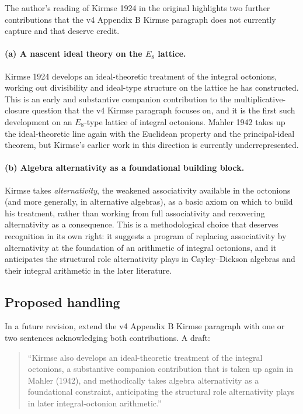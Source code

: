 \documentclass[11pt]{amsart}
\theoremstyle{remark}
\begin{document}
The author's reading of Kirmse 1924 in the original highlights two
further contributions that the v4 Appendix B Kirmse paragraph does
not currently capture and that deserve credit.

\paragraph{(a) A nascent ideal theory on the $E_8$ lattice.}
Kirmse 1924 develops an ideal-theoretic treatment of the integral
octonions, working out divisibility and ideal-type structure on the
lattice he has constructed.  This is an early and substantive
companion contribution to the multiplicative-closure question that
the v4 Kirmse paragraph focuses on, and it is the first such
development on an $E_8$-type lattice of integral octonions.  Mahler
1942 takes up the ideal-theoretic line again with the Euclidean
property and the principal-ideal theorem, but Kirmse's earlier
work in this direction is currently underrepresented.

\paragraph{(b) Algebra alternativity as a foundational building block.}
Kirmse takes \emph{alternativity}, the weakened associativity
available in the octonions (and more generally, in alternative
algebras), as a basic axiom on which to build his treatment,
rather than working from full associativity and recovering
alternativity as a consequence.  This is a methodological choice
that deserves recognition in its own right: it suggests a
program of replacing associativity by alternativity at the
foundation of an arithmetic of integral octonions, and it
anticipates the structural role alternativity plays in
Cayley--Dickson algebras and their integral arithmetic in the later
literature.

\subsection*{Proposed handling}

In a future revision, extend the v4 Appendix B Kirmse paragraph
with one or two sentences acknowledging both contributions.  A
draft:

\begin{quote}
``Kirmse also develops an ideal-theoretic treatment of the integral
octonions, a substantive companion contribution that is taken up
again in Mahler (1942), and methodically takes algebra
alternativity as a foundational constraint, anticipating the
structural role alternativity plays in later integral-octonion
arithmetic.''
\end{quote}
\end{document}
